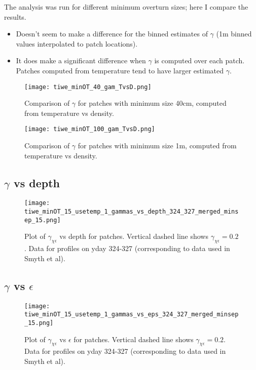\documentclass[11pt]{article}
\begin{document}
The analysis was run for different minimum overturn sizes; here I compare the results.

\begin{itemize}
\item Doesn't seem to make a difference for the binned estimates of $\gamma$ (1m binned values interpolated to patch locations).
\item It does make a significant difference when $\gamma$ is computed over each patch. Patches computed from temperature tend to have larger estimated $\gamma$.
\end{itemize}



\begin{figure}[htbp]
\texttt{[image: tiwe\_minOT\_40\_gam\_TvsD.png]}
\caption{ Comparison of $\gamma$ for patches with minimum size 40cm, computed from temperature vs density.}
\label{}
\end{figure}

\begin{figure}[htbp]
\texttt{[image: tiwe\_minOT\_100\_gam\_TvsD.png]}
\caption{ Comparison of $\gamma$ for patches with minimum size 1m, computed from temperature vs density.}
\label{}
\end{figure}









\clearpage
\subsection{$\gamma$ vs depth}


\begin{figure}[htbp]
\texttt{[image: tiwe\_minOT\_15\_usetemp\_1\_gammas\_vs\_depth\_324\_327\_merged\_minsep\_15.png]}
\caption{Plot of $\gamma_{\chi\epsilon}$ vs depth for patches. Vertical dashed line shows $\gamma_{\chi\epsilon}=0.2$. Data for profiles on yday 324-327 (corresponding to data used in Smyth et al).}
\label{patch_gam_vs_depth}
\end{figure}


\clearpage
\subsection{$\gamma$ vs $\epsilon$}


\begin{figure}[htbp]
\texttt{[image: tiwe\_minOT\_15\_usetemp\_1\_gammas\_vs\_eps\_324\_327\_merged\_minsep\_15.png]}
\caption{Plot of $\gamma_{\chi\epsilon}$ vs $\epsilon$ for patches. Vertical dashed line shows $\gamma_{\chi\epsilon}=0.2$. Data for profiles on yday 324-327 (corresponding to data used in Smyth et al).}
\label{patch_gam_vs_eps}
\end{figure}
\end{document}
